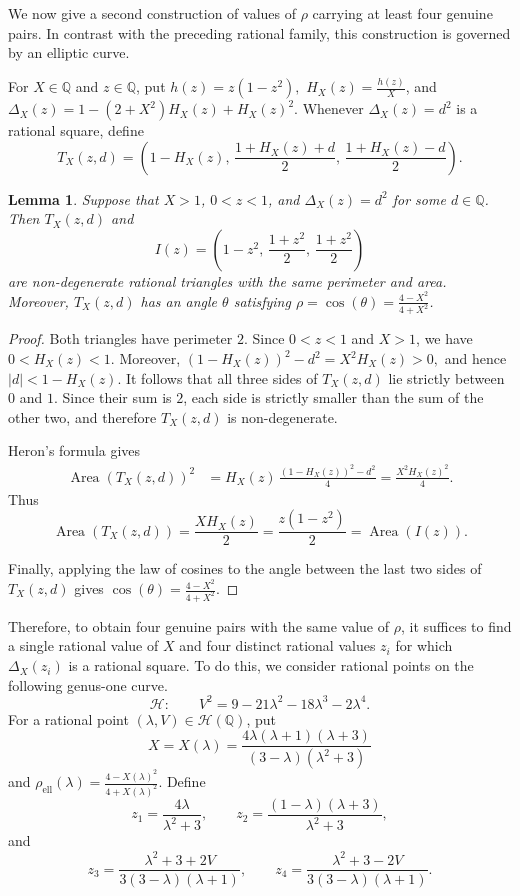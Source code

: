 \documentclass[11pt]{amsart}
\theoremstyle{plain}
\newtheorem{lem}[thm]{Lemma}
\theoremstyle{remark}
\theoremstyle{plain}
\newcommand{\Q}{\mathbb{Q}}
\begin{document}
We now give a second construction of values of $\rho$ carrying at
least four genuine pairs. In contrast with the preceding rational
family, this construction is governed by an elliptic curve.

For $X\in\Q$ and $z\in\Q$, put
$h(z)=z(1-z^2),$  $ H_X(z)=\frac{h(z)}{X}$,
and
$\Delta_X(z) = 1-(2+X^2)H_X(z)+H_X(z)^2$.
Whenever $\Delta_X(z)=d^2$ is a rational square, define
\[
T_X(z,d)
=
\left(
1-H_X(z),\,
\frac{1+H_X(z)+d}{2},\,
\frac{1+H_X(z)-d}{2}
\right).
\]

\begin{lem}\label{lem:elliptic-four-pair-construction}
Suppose that $X>1$, $0<z<1$, and
$\Delta_X(z)=d^2$ for some $d \in \Q$.
Then $T_X(z,d)$ and
\[
I(z)=
\left(
1-z^2,\,
\frac{1+z^2}{2},\,
\frac{1+z^2}{2}
\right)
\]
are non-degenerate rational triangles with the same perimeter and
area. Moreover, $T_X(z,d)$ has an angle $\theta$ satisfying
$\rho =\cos(\theta)=\frac{4-X^2}{4+X^2}$.
\end{lem}

\begin{proof}
Both triangles have perimeter $2$.
Since $0<z<1$ and $X>1$, we have $0<H_X(z)<1$. Moreover,
$(1-H_X(z))^2-d^2=X^2H_X(z)>0,$
and hence
$|d|<1-H_X(z).$
It follows that all three sides of $T_X(z,d)$ lie strictly between
$0$ and $1$. Since their sum is $2$, each side is strictly smaller
than the sum of the other two, and therefore $T_X(z,d)$ is
non-degenerate.


Heron's formula gives
\[
\begin{aligned}
\operatorname{Area}(T_X(z,d))^2
&=
H_X(z)\,
\frac{(1-H_X(z))^2-d^2}{4}=
\frac{X^2H_X(z)^2}{4}.
\end{aligned}
\]
Thus
\[
\operatorname{Area}(T_X(z,d))
=
\frac{XH_X(z)}{2}
=
\frac{z(1-z^2)}{2}
=
\operatorname{Area}(I(z)).
\]

Finally, applying the law of cosines to the angle between the last
two sides of $T_X(z,d)$ gives
$\cos(\theta) = \frac{4-X^2}{4+X^2}$.
\end{proof}
Therefore, to obtain four genuine pairs with the same value of $\rho$, it
suffices to find a single rational value of $X$ and four distinct
rational values $z_i$ for which $\Delta_X(z_i)$ is a rational square. To do this, we consider rational points on the following genus-one curve.
\[
\mathcal H:\qquad
V^2=9-21\lambda^2-18\lambda^3-2\lambda^4.
\]
For a rational point $(\lambda,V)\in\mathcal H(\Q)$, put
\[
X=X(\lambda)
=
\frac{4\lambda(\lambda+1)(\lambda+3)}
     {(3-\lambda)(\lambda^2+3)}
\]
and
$\rho_{\mathrm{ell}}(\lambda) = \frac{4-X(\lambda)^2}{4+X(\lambda)^2}$.
Define
\[
z_1=\frac{4\lambda}{\lambda^2+3},
\qquad
z_2=\frac{(1-\lambda)(\lambda+3)}{\lambda^2+3},
\]
and
\[
z_3=
\frac{\lambda^2+3+2V}
     {3(3-\lambda)(\lambda+1)},
\qquad
z_4=
\frac{\lambda^2+3-2V}
     {3(3-\lambda)(\lambda+1)}.
\]
\end{document}
